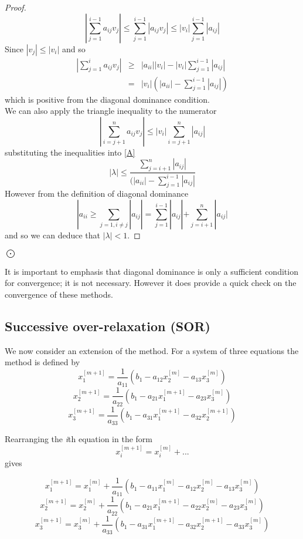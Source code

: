 \begin{proof}
\[ \left|\sum_{j=1}^{i-1}a_{ij}v_j \right| \leq \sum_{j=1}^{i-1}|a_{ij}v_j| \leq |v_i|\sum_{j=1}^{i-1}|a_{ij}|  \]
Since $|v_j| \leq |v_i|$ and so
\begin{eqnarray*} 
\left|\sum_{j=1}^{i}a_{ij}v_j \right| & \geq & |a_{ii}||v_{i}| -|v_i|\sum_{j=1}^{i-1}|a_{ij}|  \\
 & = & |v_i|(|a_{ii}| -\sum_{j=1}^{i-1}|a_{ij}|)  
\end{eqnarray*} 
which is positive from the diagonal dominance condition.\\
We can also apply the triangle inequality to the numerator
\[\left|\sum_{i=j+1}^{n}a_{ij}v_j\right| \leq |v_i| \sum_{i=j+1}^{n}|a_{ij}| \]
substituting the inequalities into \ref{A}
\[ |\lambda| \leq \frac{\sum_{j=i+1}^{n}|a_{ij}|}{(|a_{ii}| -\sum_{j=1}^{i-1}|a_{ij}|} \]
However from the definition of diagonal dominance
\[|a_{ii} \geq \sum_{j=1,i\not=j}|a_{ij}|=\sum_{j=1}^{i-1}|a_{ij}|+\sum_{j=i+1}^{n}|a_{ij}| \]
and so we can deduce that $|\lambda| < 1$.
\end{proof}$\bigodot$

It is important  to emphasis that diagonal dominance is only a sufficient
condition for convergence; it is not necessary.  However it does provide a quick check on the convergence of these methods.
\subsection{Successive over-relaxation (SOR)}

We now consider an extension of the  method. For a system of 
three equations the  method is defined by
\begin{equation*}
x_{1}^{[m+1]} = \frac{1}{a_{11}}(b_1-a_{12}x_2^{[m]} - a_{13}x^{[m]}_{3}) 
\end{equation*}
\begin{equation*}
x_{2}^{[m+1]} = \frac{1}{a_{22}}(b_1-a_{21}x_1^{[m+1]} - a_{23}x^{[m]}_{3}) 
\end{equation*}
\begin{equation*}
x_{3}^{[m+1]} = \frac{1}{a_{33}}(b_1-a_{31}x_1^{[m+1]} - a_{32}x^{[m+1]}_{2})
\end{equation*}

Rearranging the \emph{i}th equation in the form
\[ x_{i}^{[m+1]} = x_{i}^{[m]} + . .. \]
gives 

\begin{equation*}
x_{1}^{[m+1]} =x_1^{[m]}+ \frac{1}{a_{11}}(b_1-a_{11}x_{1}^{[m]}-a_{12}x_2^{[m]} - a_{13}x^{[m]}_{3}) 
\end{equation*}
\begin{equation*}
x_{2}^{[m+1]} =x_2^{[m]}+ \frac{1}{a_{22}}(b_1-a_{21}x_1^{[m+1]}-a_{22}x_{2}^{[m]} - a_{23}x^{[m]}_{3}) 
\end{equation*}
\begin{equation*}
x_{3}^{[m+1]} =x_3^{[m]}+ \frac{1}{a_{33}}(b_1-a_{31}x_1^{[m+1]} - a_{32}x^{[m+1]}_{2}-a_{33}x_{3}^{[m]})
\end{equation*}

